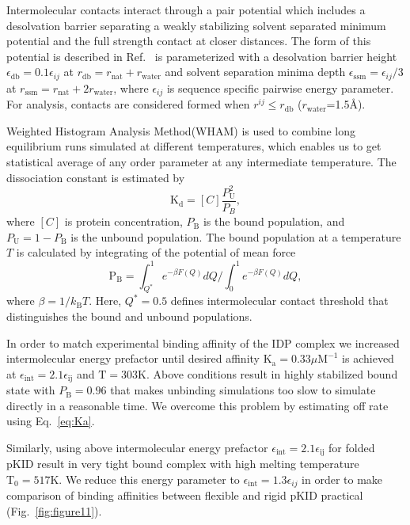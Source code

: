\documentclass[../talant.diss.submit.tex]{subfiles}
\begin{document}
Intermolecular contacts interact through a pair potential which includes a
desolvation barrier separating a weakly stabilizing solvent separated minimum
potential and the full strength contact at closer distances. The form of this
potential is described in Ref.~\cite{cheung:02} is parameterized with a
desolvation barrier height $\epsilon_{\mathrm{db}}=0.1\epsilon_{ij}$ at
$r_\mathrm{db} = r_{\mathrm{nat}} + r_{\mathrm{water}}$ and solvent separation
minima depth $\epsilon_{\mathrm{ssm}}=\epsilon_{ij}/3$ at
$r_\mathrm{ssm} = r_{\mathrm{nat}} + 2r_{\mathrm{water}} $, where
$\epsilon_{ij}$ is sequence specific pairwise energy parameter. For analysis,
contacts are considered formed when $r^{ij} \leq r_{\mathrm{db}}$
($r_{\mathrm{water}}$=1.5\AA).

Weighted Histogram Analysis Method\cite{kumarWHAM:92}(WHAM) is used to combine
long equilibrium runs simulated at different temperatures, which enables us to
get statistical average of any order parameter at any intermediate
temperature\cite{noel:10}. The dissociation constant is estimated by
\begin{equation}
  \label{eq:kd}
  \mathrm{K_{d}}= [C]\frac{P_{\mathrm{U}}^2}{P_{B}},
\end{equation}
where $[C]$ is protein concentration, $P_{\mathrm{B}}$ is the bound population,
and $P_\mathrm{U} = 1 - P_\mathrm{B}$ is the unbound population. The bound
population at a temperature $T$ is calculated by integrating of the potential of
mean force
\begin{equation}
  \label{eq:pu}
  \mathrm{P_{\mathrm{B}}}=\int_{Q^*}^{1} e^{-\beta F(Q)}dQ/\int_{0}^{1} e^{-\beta F(Q)}dQ,
\end{equation}
where $\beta = 1/k_\mathrm{B} T$.  Here, $Q^*=0.5$ defines intermolecular
contact threshold that distinguishes the bound and unbound populations.

In order to match experimental binding affinity\cite{zor:02} of the IDP complex
we increased intermolecular energy prefactor until desired affinity
$\mathrm{K_{a}}=0.33 \mu \mathrm{M^{-1}}$ is achieved at
$\epsilon_{\mathrm{int}}=2.1\epsilon_{\mathrm{ij}}$ and
$\mathrm{T}=303\mathrm{K}$.  Above conditions result in highly stabilized bound
state with $P_{\mathrm{B}}=0.96$ that makes unbinding simulations too slow to
simulate directly in a reasonable time. We overcome this problem by estimating
off rate using Eq.~\ref{eq:Ka}.

Similarly, using above intermolecular energy prefactor
$\epsilon_{\mathrm{int}}=2.1\epsilon_{\mathrm{ij}}$ for folded pKID result in
very tight bound complex with high melting temperature
$\mathrm{T_{0}}=517\mathrm{K}$.  We reduce this energy parameter to
$\epsilon_{\mathrm{int}}=1.3\epsilon_{ij}$ in order to make comparison of
binding affinities between flexible and rigid pKID practical (Fig.~\ref{fig:figure11}).
\end{document}
